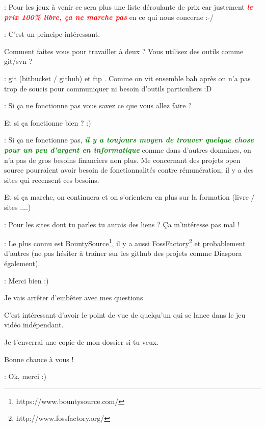 \documentclass[a4paper,12pt, draft]{report}
\newcommand{\goodPoint}[1]{\textcolor{green}{\textbf{\textit{#1}}}}
\newcommand{\badPoint}[1]{\textcolor{red}{\textbf{\textit{#1}}}}
\begin{document}
\begin{description}
\item 
\item [Réponse]: Pour les jeux à venir ce sera plus une liste déroulante de prix car justement \badPoint{le prix 100\% libre, ça ne marche pas} en ce qui nous concerne :-/
\item 
\item [Question]: C'est un principe intéressant.
\item Comment faites vous pour travailler à deux ? Vous utilisez des outils comme git/svn ?
\item 
\item [Réponse]: git (bitbucket / github) et ftp  . Comme on vit ensemble bah après on n'a pas trop de soucis pour communiquer ni besoin d'outils particuliers :D
\item 
\item [Question]: Si ça ne fonctionne pas vous savez ce que vous allez faire ?
\item Et si ça fonctionne bien ? :)
\item 
\item [Réponse]: Si ça ne fonctionne pas, \goodPoint{il y a toujours moyen de trouver quelque chose pour un peu d'argent en informatique} comme dans d'autres domaines, on n'a pas de gros besoins financiers non plus. Me concernant des projets open source pourraient avoir besoin de fonctionnalités contre rémunération, il y a des sites qui recensent ces besoins.
\item Et si ça marche, on continuera et on s'orientera en plus sur la formation (livre / sites ....)
\item 
\item [Question]: Pour les sites dont tu parles tu aurais des liens ? Ça m'intéresse pas mal !
\item 
\item [Réponse]: Le plus connu est BountySource\footnote{https://www.bountysource.com/}, il y a aussi FossFactory\footnote{http://www.fossfactory.org/} et probablement d'autres (ne pas hésiter à traîner sur les github des projets comme Diaspora également).
\item 
\item [Question]: Merci bien :)
\item Je vais arrêter d'embêter avec mes questions  
\item C'est intéressant d'avoir le point de vue de quelqu'un qui se lance dans le jeu vidéo indépendant.
\item Je t'enverrai une copie de mon dossier si tu veux.
\item Bonne chance à vous !
\item 
\item [Réponse]: Ok, merci :)

\end{description}
\end{document}
